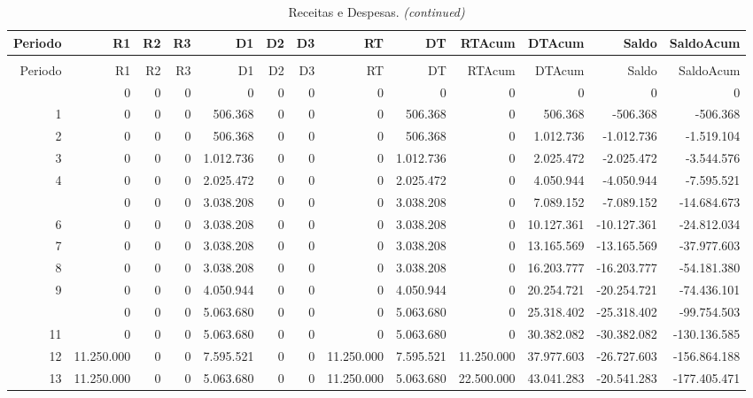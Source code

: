 \documentclass[
  10pt,
  a4paper]{article}
\begin{document}
\begin{landscape}\begingroup\fontsize{10}{12}\selectfont

\begin{longtable}[t]{rrrrrrrrrrrrr}
\caption{\label{tab:RD}Receitas e Despesas.}\\
\toprule
Periodo & R1 & R2 & R3 & D1 & D2 & D3 & RT & DT & RTAcum & DTAcum & Saldo & SaldoAcum\\
\midrule
\endfirsthead
\caption[]{Receitas e Despesas. \textit{(continued)}}\\
\toprule
Periodo & R1 & R2 & R3 & D1 & D2 & D3 & RT & DT & RTAcum & DTAcum & Saldo & SaldoAcum\\
\midrule
\endhead

\endfoot
\bottomrule
\endlastfoot
0 & 0 & 0 & 0 & 0 & 0 & 0 & 0 & 0 & 0 & 0 & 0 & 0\\
1 & 0 & 0 & 0 & 506.368 & 0 & 0 & 0 & 506.368 & 0 & 506.368 & -506.368 & -506.368\\
2 & 0 & 0 & 0 & 506.368 & 0 & 0 & 0 & 506.368 & 0 & 1.012.736 & -1.012.736 & -1.519.104\\
3 & 0 & 0 & 0 & 1.012.736 & 0 & 0 & 0 & 1.012.736 & 0 & 2.025.472 & -2.025.472 & -3.544.576\\
4 & 0 & 0 & 0 & 2.025.472 & 0 & 0 & 0 & 2.025.472 & 0 & 4.050.944 & -4.050.944 & -7.595.521\\
\addlinespace
5 & 0 & 0 & 0 & 3.038.208 & 0 & 0 & 0 & 3.038.208 & 0 & 7.089.152 & -7.089.152 & -14.684.673\\
6 & 0 & 0 & 0 & 3.038.208 & 0 & 0 & 0 & 3.038.208 & 0 & 10.127.361 & -10.127.361 & -24.812.034\\
7 & 0 & 0 & 0 & 3.038.208 & 0 & 0 & 0 & 3.038.208 & 0 & 13.165.569 & -13.165.569 & -37.977.603\\
8 & 0 & 0 & 0 & 3.038.208 & 0 & 0 & 0 & 3.038.208 & 0 & 16.203.777 & -16.203.777 & -54.181.380\\
9 & 0 & 0 & 0 & 4.050.944 & 0 & 0 & 0 & 4.050.944 & 0 & 20.254.721 & -20.254.721 & -74.436.101\\
\addlinespace
10 & 0 & 0 & 0 & 5.063.680 & 0 & 0 & 0 & 5.063.680 & 0 & 25.318.402 & -25.318.402 & -99.754.503\\
11 & 0 & 0 & 0 & 5.063.680 & 0 & 0 & 0 & 5.063.680 & 0 & 30.382.082 & -30.382.082 & -130.136.585\\
12 & 11.250.000 & 0 & 0 & 7.595.521 & 0 & 0 & 11.250.000 & 7.595.521 & 11.250.000 & 37.977.603 & -26.727.603 & -156.864.188\\
13 & 11.250.000 & 0 & 0 & 5.063.680 & 0 & 0 & 11.250.000 & 5.063.680 & 22.500.000 & 43.041.283 & -20.541.283 & -177.405.471\\

\end{longtable}
\end{landscape}
\end{document}
